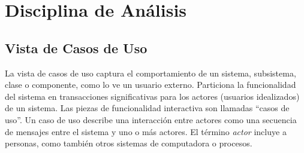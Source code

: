
\chapter{Disciplina de Análisis}
	\label{chap:analisis}
	\section{Vista de Casos de Uso}
		La vista de casos de uso captura el comportamiento de un sistema, subsistema, clase o componente, como lo ve un usuario externo. Particiona la funcionalidad del sistema en transacciones significativas para los actores (usuarios idealizados) de un sistema. 
		Las piezas de funcionalidad interactiva son llamadas ``casos de uso''. Un caso de uso describe una interacción entre actores como una secuencia de mensajes entre el sistema y uno o más actores. El término \emph{actor} incluye a personas, como también otros sistemas de computadora o procesos.

